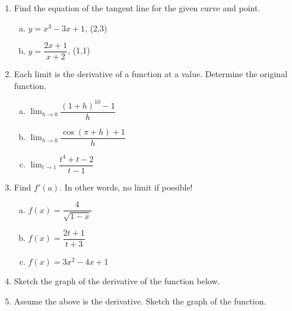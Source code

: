 \documentclass[10pt]{article}
\newcommand{\ds}{\displaystyle}
\theoremstyle{Theorem}
\theoremstyle{definition}
\theoremstyle{remark}
\theoremstyle{custom}
\begin{document}
\begin{enumerate}[1.]
\item Find the equation of the tangent line for the given curve and point.
\begin{enumerate}[a.]
\item $y=x^3-3x+1$, (2,3)
\item $y=\dfrac{2x+1}{x+2}$, (1,1)
\end{enumerate}
\item Each limit is the derivative of a function at a value. Determine the original function.
\begin{enumerate}[a.]
\item $\ds\lim_{h\rightarrow 0}\dfrac{(1+h)^{10}-1}{h}$
\item $\ds\lim_{h\rightarrow 0}\dfrac{\cos(\pi+h)+1}{h}$
\item $\ds\lim_{t\rightarrow 1}\dfrac{t^4+t-2}{t-1}$
\end{enumerate}
\item Find $f'(a)$. In other words, no limit if possible!
\begin{enumerate}[a.]
\item $f(x)=\dfrac{4}{\sqrt{1-x}}$
\item $f(x)=\dfrac{2t+1}{t+3}$
\item $f(x)=3x^2-4x+1$
\end{enumerate}
\item Sketch the graph of the derivative of the function below. 
\begin{center}
    \end{center}
\item Assume the above is the derivative. Sketch the graph of the function.
\end{enumerate}
\end{document}
